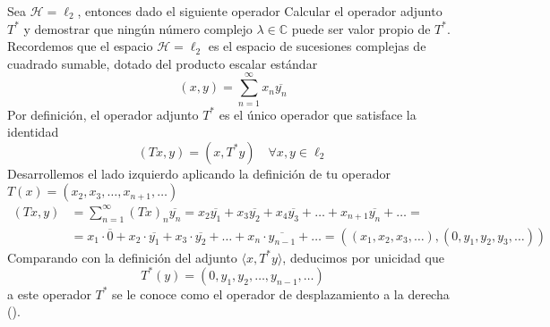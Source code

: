 \begin{ejercicio}
    Sea $\mathcal{H} = \ell_2$, entonces dado el siguiente operador
    Calcular el operador adjunto $T^*$ y demostrar que ningún número complejo $\lambda \in \mathbb{C}$ puede ser valor propio de $T^*$. \\

    \noindent
    Recordemos que el espacio $\mathcal{H} = \ell_2$ es el espacio de sucesiones complejas de cuadrado sumable, dotado del producto escalar estándar
    $$( x, y ) = \sum_{n=1}^{\infty} x_n \overline{y_n}$$
    Por definición, el operador adjunto $T^*$ es el único operador que satisface la identidad
    $$( Tx, y ) = ( x, T^*y ) \quad \forall x, y \in \ell_2$$
    Desarrollemos el lado izquierdo aplicando la definición de tu operador $T(x) = (x_2, x_3, \dots, x_{n+1}, \dots)$
    \begin{align*}
        ( Tx, y ) &= \sum_{n=1}^{\infty} (Tx)_n \overline{y_n} = x_2\overline{y_1} + x_3\overline{y_2} + x_4\overline{y_3} + \dots + x_{n+1}\overline{y_n} + \dots= \\
        &=x_1 \cdot \overline{0} + x_2 \cdot \overline{y_1} + x_3 \cdot \overline{y_2} + \dots + x_n \cdot \overline{y_{n-1}} + \dots =( (x_1, x_2, x_3, \dots), (0, y_1, y_2, y_3, \dots) )
    \end{align*}
    Comparando con la definición del adjunto $\langle x, T^*y \rangle$, deducimos por unicidad que
    $$T^*(y) = (0, y_1, y_2, \dots, y_{n-1}, \dots)$$
    a este operador $T^*$ se le conoce como el operador de desplazamiento a la derecha ().\\ 


\end{ejercicio}
